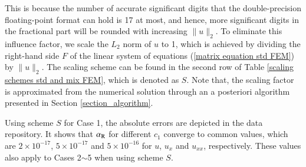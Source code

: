 \documentclass[review,3p]{elsarticle}
\begin{document}

This is because the number of accurate significant digits that the double-precision floating-point format can hold is 17 at most, and hence, more significant digits in the fractional part will be rounded with increasing $\|u\|_2$. To eliminate this influence factor, we scale the $L_2$ norm of $u$ to 1, which is achieved by dividing the right-hand side $F$ of the linear system of equations (\ref{matrix equation std FEM}) by $\|u\|_{2}$.
The scaling scheme can be found in the second row of Table \ref{scaling schemes std and mix FEM}, which is denoted as $S$.
Note that, the scaling factor is approximated from the numerical solution through an a posteriori algorithm presented in Section \ref{section_algorithm}.

Using scheme $S$ for Case 1, the absolute errors are depicted in the data repository. It shows that $\alpha_{\rm R}$ for different $c_1$ converge to common values, which are $2\times10^{-17}$, $5\times10^{-17}$ and $5\times10^{-16}$ for $u$, $u_{x}$ and $u_{xx}$, respectively. These values also apply to Cases 2$\sim$5 when using scheme $S$. 
\end{document}
